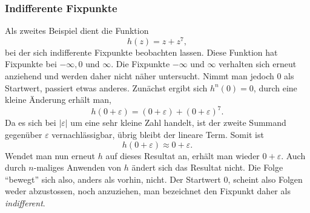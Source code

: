 \subsubsection{Indifferente Fixpunkte}
Als zweites Beispiel dient die Funktion
\begin{equation*}
    h(z) = z + z^7,
\end{equation*}
bei der sich indifferente Fixpunkte beobachten lassen.
Diese Funktion hat Fixpunkte bei $-\infty, 0$ und $\infty$.
Die Fixpunkte $-\infty$ und $\infty$ verhalten sich erneut anziehend und werden daher nicht näher untersucht.
Nimmt man jedoch $0$ als Startwert, passiert etwas anderes.
Zunächst ergibt sich $h^n(0) = 0$, durch eine kleine Änderung erhält man,
\begin{equation*}
    h(0 + \varepsilon) = (0 + \varepsilon) + (0 + \varepsilon)^7.
\end{equation*}
Da es sich bei $|\varepsilon|$ um eine sehr kleine Zahl handelt, ist der zweite Summand gegenüber $\varepsilon$ vernachlässigbar, übrig bleibt der lineare Term.
Somit ist
\begin{equation*}
    h(0 + \varepsilon) \approx 0 + \varepsilon.
\end{equation*}
Wendet man nun erneut $h$ auf dieses Resultat an, erhält man wieder $0 + \varepsilon$.
Auch durch $n$-maliges Anwenden von $h$ ändert sich das Resultat nicht.
Die Folge ``bewegt'' sich also, anders als vorhin, nicht.
Der Startwert $0$, scheint also Folgen weder abzustossen, noch anzuziehen, man bezeichnet den Fixpunkt daher als \emph{indifferent}.
%

